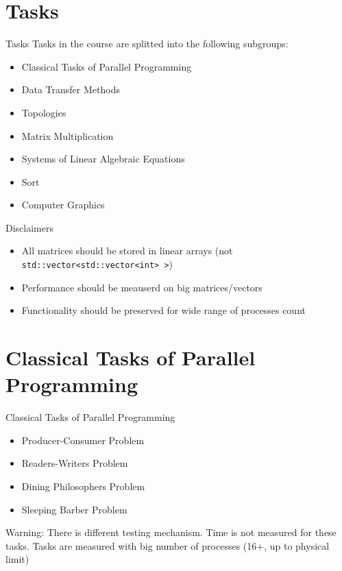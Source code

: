 \documentclass{beamer}
\begin{document}
\section{Tasks}

\begin{frame}{Tasks}
  Tasks in the course are splitted into the following subgroups:
  \begin{itemize}
    \item Classical Tasks of Parallel Programming
    \item Data Transfer Methods
    \item Topologies
    \item Matrix Multiplication
    \item Systems of Linear Algebraic Equations
    \item Sort
    \item Computer Graphics
  \end{itemize}
\end{frame}

\begin{frame}{Disclaimers}
  \begin{itemize}
    \item All matrices should be stored in linear arrays (not \texttt{std::vector<std::vector<int> >})
    \item Performance should be meauserd on big matrices/vectors
    \item Functionality should be preserved for wide range of processes count
  \end{itemize}
\end{frame}

\section{Classical Tasks of Parallel Programming}

\begin{frame}{Classical Tasks of Parallel Programming}
  \begin{itemize}
    \item Producer-Consumer Problem
    \item Readers-Writers Problem
    \item Dining Philosophers Problem
    \item Sleeping Barber Problem
  \end{itemize}
  Warning:
  There is different testing mechanism. Time is not measured for these tasks.
  Tasks are measured with big number of processes (16+, up to physical limit)
\end{frame}
\end{document}
